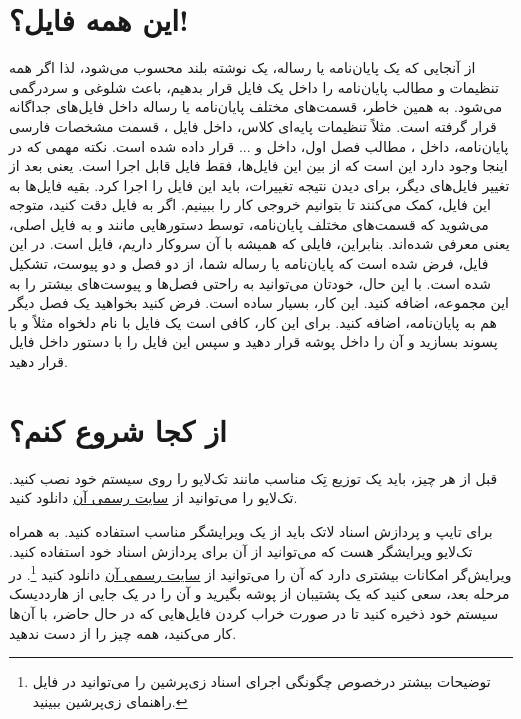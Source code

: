 \section{این همه فایل؟!}\label{sec2}
از آنجایی که یک پایان‌نامه یا رساله، یک نوشته بلند محسوب می‌شود، لذا اگر همه تنظیمات و مطالب پایان‌نامه را داخل یک فایل قرار بدهیم، باعث شلوغی
و سردرگمی می‌شود. به همین خاطر، قسمت‌های مختلف پایان‌نامه یا رساله  داخل فایل‌های جداگانه قرار گرفته است. مثلاً تنظیمات پایه‌ای کلاس، داخل فایل
، 
قسمت مشخصات فارسی پایان‌نامه، داخل 
،
مطالب فصل اول، داخل 
و ... قرار داده شده است. نکته مهمی که در اینجا وجود دارد این است که از بین این  فایل‌ها، فقط فایل 
قابل اجرا است. یعنی بعد از تغییر فایل‌های دیگر، برای دیدن نتیجه تغییرات، باید این فایل را اجرا کرد. بقیه فایل‌ها به این فایل، کمک می‌کنند تا بتوانیم خروجی کار را ببینیم. اگر به فایل 
دقت کنید، متوجه می‌شوید که قسمت‌های مختلف پایان‌نامه، توسط دستورهایی مانند 
و
به فایل اصلی، یعنی 
معرفی شده‌اند. بنابراین، فایلی که همیشه با آن سروکار داریم، فایل 
است.
در این فایل، فرض شده است که پایان‌نامه یا رساله شما، از دو فصل و دو پیوست، تشکیل شده است. با این حال، خودتان می‌توانید به راحتی فصل‌ها و پیوست‌های بیشتر را به این مجموعه، اضافه کنید. این کار، بسیار ساده است. فرض کنید بخواهید یک فصل دیگر هم به پایان‌نامه، اضافه کنید. برای این کار، کافی است یک فایل با نام دلخواه مثلاً 
و با پسوند 
بسازید و آن را داخل پوشه 
قرار دهید و سپس این فایل را با دستور 
\verb!!
داخل فایل
قرار دهید.
\section{از کجا شروع کنم؟}
قبل از هر چیز، باید یک توزیع تِک مناسب مانند تک‌لایو
را روی سیستم خود نصب کنید. تک‌لایو  را می‌توانید از 
\href{http://www.tug.org/texlive}{سایت رسمی آن}%
دانلود کنید. 

برای تایپ و پردازش اسناد لاتک باید از یک ویرایشگر مناسب استفاده کنید. به همراه تک‌لایو ویرایشگر  هست که می‌توانید از آن برای پردازش اسناد خود استفاده کنید. 
ویرایش‌گر 
امکانات بیشتری دارد که آن را می‌توانید  از 
\href{http://http://www.texstudio.org}{سایت رسمی آن}
دانلود کنید%
\footnote{توضیحات بیشتر درخصوص چگونگی اجرای اسناد زی‌پرشین را می‌توانید در فایل راهنمای زی‌پرشین ببینید.}.
در مرحله بعد، سعی کنید که  یک پشتیبان از پوشه 
بگیرید و آن را در یک جایی از هارددیسک سیستم خود ذخیره کنید تا در صورت خراب کردن فایل‌هایی که در حال حاضر، با آن‌ها کار می‌کنید، همه چیز را از 
دست ندهید.

